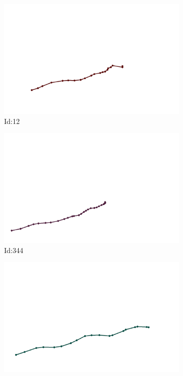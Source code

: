 \documentclass[12pt,twoside]{report}
\begin{document}
\begin{figure}
\centering
\begin{subfigure}[b]{0.20\textwidth}
\centering
\includegraphics[width=\textwidth]{../../trajectories/12.png}
\caption{Id:12}
\end{subfigure}
\begin{subfigure}[b]{0.20\textwidth}
\centering
\includegraphics[width=\textwidth]{../../trajectories/344.png}
\caption{Id:344}
\end{subfigure}
\begin{subfigure}[b]{0.20\textwidth}
\centering
\includegraphics[width=\textwidth]{../../trajectories/671.png}

\end{subfigure}
\end{figure}
\end{document}

